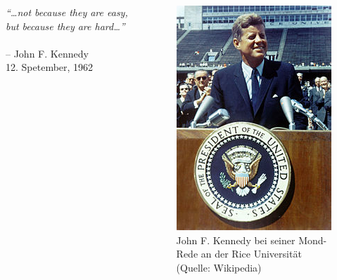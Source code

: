 \begin{frame}
	\begin{columns}
		\begin{column}{0.5\textwidth}
			\textit{``\dots not because they are easy,
				but because they are hard\dots''}
			~ \\ ~ \\
			\footnotesize
			\hfill{} -- John F. Kennedy \\
			\hfill{}	12. Spetember, 1962
		\end{column}
		\begin{column}{0.5\textwidth}
			\begin{figure}
				\includegraphics[scale=2]{../../fig/kennedy_01.jpg}
				\caption{\footnotesize
					John F. Kennedy bei seiner Mond-Rede an
					der Rice Universität (Quelle: Wikipedia)}
			\end{figure}
		\end{column}
	\end{columns}
\end{frame}
